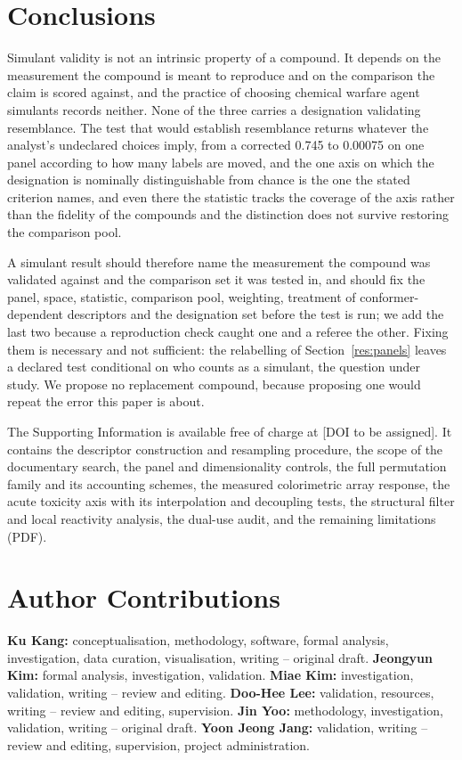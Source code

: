 \documentclass[journal=ancham,manuscript=article,margin=1in]{achemso}
\begin{document}
\section{Conclusions}
\label{sec:conclusions}

Simulant validity is not an intrinsic property of a compound. It depends on the
measurement the compound is meant to reproduce and on the comparison the claim
is scored against, and the practice of choosing chemical warfare agent simulants
records neither. None of the three carries a designation validating resemblance. The
test that would establish resemblance returns whatever the analyst's undeclared
choices imply, from a corrected 0.745 to 0.00075 on one panel according to how
many labels are moved, and the one axis on which the designation is
nominally distinguishable from chance is the one the stated criterion names,
and even there the statistic tracks the coverage of the axis rather than the
fidelity of the compounds and the distinction does not survive restoring the
comparison pool.

A simulant result should therefore name the measurement the compound was
validated against and the comparison set it was tested in, and should fix the
panel, space, statistic, comparison pool, weighting, treatment of
conformer-dependent
descriptors and the designation set before the test is run; we add the last two
because a reproduction check caught one and a referee the other.
Fixing them is necessary and not sufficient: the relabelling of
Section~\ref{res:panels} leaves a declared test conditional on who counts as a
simulant, the question under study. We propose no replacement compound, because proposing
one would repeat the error this paper is about.

\begin{suppinfo}
The Supporting Information is available free of charge at [DOI to be assigned].
It contains the descriptor construction and resampling procedure, the scope of
the documentary search, the panel and dimensionality controls, the full
permutation family and its accounting schemes, the measured colorimetric array
response, the acute toxicity axis with its interpolation and decoupling tests,
the structural filter and local reactivity analysis, the dual-use audit, and the
remaining limitations (PDF).
\end{suppinfo}

\section*{Author Contributions}
\textbf{Ku Kang:} conceptualisation, methodology, software, formal analysis,
investigation, data curation, visualisation, writing -- original draft.
\textbf{Jeongyun Kim:} formal analysis, investigation, validation.
\textbf{Miae Kim:} investigation, validation, writing -- review and editing.
\textbf{Doo-Hee Lee:} validation, resources, writing -- review and
editing, supervision. \textbf{Jin Yoo:} methodology, investigation,
validation, writing -- original draft. \textbf{Yoon Jeong Jang:} validation,
writing -- review and editing, supervision, project administration.
\end{document}
